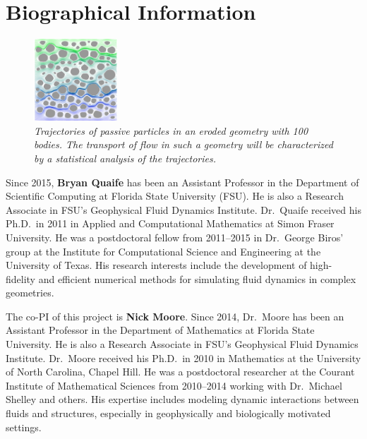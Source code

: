\documentclass[11pt]{article}
\begin{document}
\section{Biographical Information}

\begin{figure}
\centering
\includegraphics[width=0.28\textwidth]{figs/100b_t100tracer.pdf}
\caption{\label{fig:streams} \em Trajectories of passive particles in an
eroded geometry with 100 bodies.  The transport of flow in such a
geometry will be characterized by a statistical analysis of the
trajectories.}
\end{figure}
Since 2015, {\bf Bryan Quaife} has been an Assistant Professor in the
Department of Scientific Computing at Florida State University (FSU).
He is also a Research Associate in FSU's Geophysical Fluid Dynamics
Institute.  Dr.~Quaife received his Ph.D.~in 2011 in Applied and
Computational Mathematics at Simon Fraser University.  He was a
postdoctoral fellow from 2011--2015 in Dr.~George Biros' group at the
Institute for Computational Science and Engineering at the University of
Texas.  His research interests include the development of  high-fidelity
and efficient numerical methods for simulating fluid dynamics in complex
geometries.

The co-PI of this project is {\bf Nick Moore}.  Since 2014, Dr.~Moore
has been an Assistant Professor in the Department of Mathematics at
Florida State University.  He is also a Research Associate in FSU's
Geophysical Fluid Dynamics Institute.  Dr.~Moore received his Ph.D.~in
2010 in Mathematics at the University of North Carolina, Chapel Hill. He
was a postdoctoral researcher at the Courant Institute of Mathematical
Sciences from 2010--2014 working with Dr.~Michael Shelley and others.
His expertise includes modeling dynamic interactions between fluids and
structures, especially in geophysically and biologically motivated
settings. 


\end{document}
